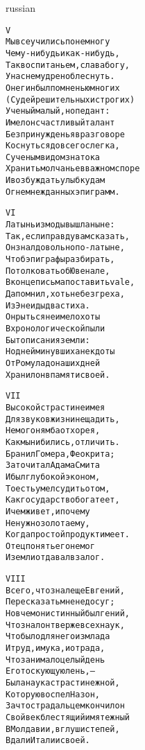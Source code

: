 \documentclass[12pt,twocolumn]{article}
\begin{document}
\begin{center}
\begin{otherlanguage*}{russian}
\begin{minipage}[t]{\dimexpr 0.5\textwidth -\tabcolsep-.5pt}
\begin{alltt}\normalfont\centering
V
Мы все учились понемногу
Чему-нибудь и как-нибудь,
Так воспитаньем, слава богу,
У нас немудрено блеснуть.
Онегин был по мненью многих
(Судей решительных и строгих)
Ученый малый, но педант:
Имел он счастливый талант
Без принужденья в разговоре
Коснуться до всего слегка,
С ученым видом знатока
Хранить молчанье в важном споре
И возбуждать улыбку дам
Огнем нежданных эпиграмм.
\end{alltt}
\end{minipage}

\begin{minipage}[t]{\dimexpr 0.5\textwidth -\tabcolsep-.5pt}
\begin{alltt}\normalfont\centering
VI
Латынь из моды вышла ныне:
Так, если правду вам сказать,
Он знал довольно по-латыне,
Чтоб эпиграфы разбирать,
Потолковать об Ювенале,
В конце письма поставить vale,
Да помнил, хоть не без греха,
Из Энеиды два стиха.
Он рыться не имел охоты
В хронологической пыли
Бытописания земли:
Но дней минувших анекдоты
От Ромула до наших дней
Хранил он в памяти своей.
\end{alltt}
\end{minipage}
\clearpage

\begin{minipage}[t]{\dimexpr 0.5\textwidth -\tabcolsep-.5pt}
\begin{alltt}\normalfont\centering
VII
Высокой страсти не имея
Для звуков жизни не щадить,
Не мог он ямба от хорея,
Как мы ни бились, отличить.
Бранил Гомера, Феокрита;
Зато читал Адама Смита
И был глубокой эконом,
То есть умел судить о том,
Как государство богатеет,
И чем живет, и почему
Не нужно золота ему,
Когда простой продукт имеет.
Отец понять его не мог
И земли отдавал в залог.
\end{alltt}
\end{minipage}

\begin{minipage}[t]{\dimexpr 0.5\textwidth -\tabcolsep-.5pt}
\begin{alltt}\normalfont\centering
VIII
Всего, что знал еще Евгений,
Пересказать мне недосуг;
Но в чем он истинный был гений,
Что знал он тверже всех наук,
Что было для него измлада
И труд, и мука, и отрада,
Что занимало целый день
Его тоскующую лень, —
Была наука страсти нежной,
Которую воспел Назон,
За что страдальцем кончил он
Свой век блестящий и мятежный
В Молдавии, в глуши степей,
Вдали Италии своей.
\end{alltt}
\end{minipage}
\clearpage


\end{otherlanguage*}
\end{center}
\end{document}
